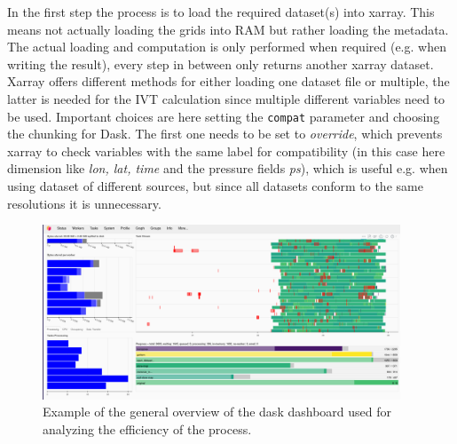 In the first step the process is to load the required dataset(s) into xarray. 
This means not actually loading the grids into RAM but rather loading the metadata. 
The actual loading and computation is only performed when required (e.g. when writing the result), every step in between only returns another xarray dataset. 
Xarray offers different methods for either loading one dataset file or multiple, the latter is needed for the IVT calculation since multiple different variables need to be used. 
Important choices are here setting the \texttt{compat} parameter and choosing the chunking for Dask. 
The first one needs to be set to \textit{override}, which prevents xarray to check variables with the same label for compatibility (in this case here dimension like \textit{lon, lat, time} and the pressure fields \textit{ps}), which is useful e.g. when using dataset of different sources, but since all datasets conform to the same resolutions it is unnecessary. 

\begin{figure}[htb]
  \begin{center}
    \includegraphics[width=0.95\textwidth]{figures/dask_dashboard_example.png}
  \end{center}
  \caption{Example of the general overview of the dask dashboard used for analyzing the efficiency of the process.}
  \label{fig:dask-dashboard}
\end{figure}



